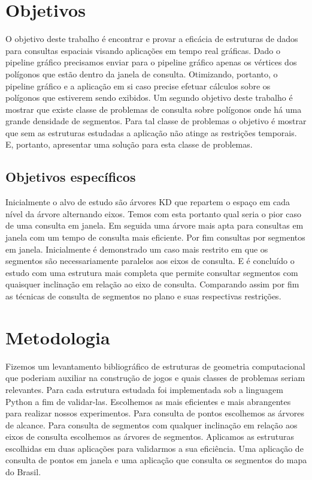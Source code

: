\section{Objetivos}
O objetivo deste trabalho é encontrar e provar a eficácia de estruturas de dados para consultas espaciais visando aplicações em tempo real gráficas. Dado o pipeline gráfico precisamos enviar para o pipeline gráfico apenas os vértices dos polígonos que estão dentro da janela de consulta. Otimizando, portanto, o pipeline gráfico e a aplicação em si caso precise efetuar cálculos sobre os polígonos que estiverem sendo exibidos.
Um segundo objetivo deste trabalho é mostrar que existe classe de problemas de consulta sobre polígonos onde há uma grande densidade de segmentos. Para tal classe de problemas o objetivo é mostrar que sem as estruturas estudadas a aplicação não atinge as restrições temporais. E, portanto, apresentar uma solução para esta classe de problemas.
\subsection{Objetivos específicos}
Inicialmente o alvo de estudo são árvores KD que repartem o espaço em cada nível da árvore alternando eixos. Temos com esta portanto qual seria o pior caso de uma consulta em janela. Em seguida uma árvore mais apta para consultas em janela com um tempo de consulta mais eficiente. Por fim consultas por segmentos em janela. Inicialmente é demonstrado um caso mais restrito em que os segmentos são necessariamente paralelos aos eixos de consulta. E é concluído o estudo com uma estrutura mais completa que permite consultar segmentos com quaisquer inclinação em relação ao eixo de consulta. Comparando assim por fim as técnicas de consulta de segmentos no plano e suas respectivas restrições.

\section{Metodologia}
Fizemos um levantamento bibliográfico de estruturas de geometria computacional que poderiam auxiliar na construção de jogos e quais classes de problemas seriam relevantes. Para cada estrutura estudada foi implementada sob a linguagem Python a fim de validar-las. Escolhemos as mais eficientes e mais abrangentes para realizar nossos experimentos. Para consulta de pontos escolhemos as árvores de alcance. Para consulta de segmentos com qualquer inclinação em relação aos eixos de consulta escolhemos as árvores de segmentos. Aplicamos as estruturas escolhidas em duas aplicações para validarmos a sua eficiência. Uma aplicação de consulta de pontos em janela e uma aplicação que consulta os segmentos do mapa do Brasil.

